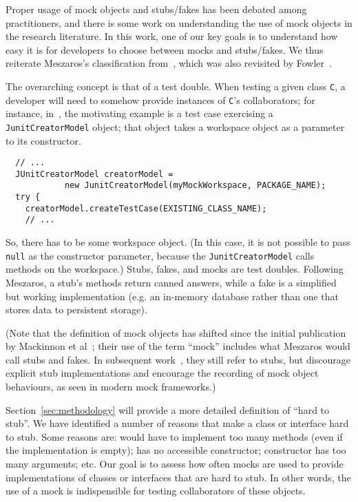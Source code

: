 Proper usage of mock objects and stubs/fakes has been debated among practitioners, and there is some work on understanding the use of mock objects in the research literature. In this work, one of our key goals is to understand how easy it is for developers to choose between mocks and stubs/fakes. We thus reiterate Meszaros's classification from~\cite{meszaros2007xunit}, which was also revisited by Fowler~\cite{fowler07:_mocks_arent_stubs}. 

The overarching concept is that of a test double. When testing a given class \texttt{C}, a developer will need to somehow provide instances of \texttt{C}'s collaborators; for instance, in~\cite{mackinnon00:_endo_testin}, the motivating example is a test case exercising a \texttt{JunitCreatorModel} object; that object takes a workspace object as a parameter to its constructor.

\begin{lstlisting}
  // ...
  JUnitCreatorModel creatorModel =
            new JunitCreatorModel(myMockWorkspace, PACKAGE_NAME);
  try {
    creatorModel.createTestCase(EXISTING_CLASS_NAME);
    // ...
\end{lstlisting}

So, there has to be some workspace object. (In this case, it is not possible to pass \texttt{null} as the constructor parameter, because the \texttt{JunitCreatorModel} calls methods on the workspace.) Stubs, fakes, and mocks are test doubles. Following Meszaros, a stub's methods return canned answers, while a fake is a simplified but working implementation (e.g. an in-memory database rather than one that stores data to persistent storage). 

(Note that the definition of mock objects has shifted since the initial publication by Mackinnon et al~\cite{mackinnon00:_endo_testin}; their use of the term ``mock'' includes what Meszaros would call stubs and fakes. In subsequent work~\cite{freeman04:_mock_roles_objec}, they still refer to stubs, but discourage explicit stub implementations and encourage the recording of mock object behaviours, as seen in modern mock frameworks.)

Section~\ref{sec:methodology} will provide a more detailed definition of ``hard to stub''. We have identified a number of reasons that make a class or interface hard to stub. Some reasons are: would have to implement too many methods (even if the implementation is empty); has no accessible constructor; constructor has too many arguments; etc. Our goal is to assess how often mocks are used to provide implementations of classes or interfaces that are hard to stub. In other words, the use of a mock is indispensible for testing collaborators of these objects.

